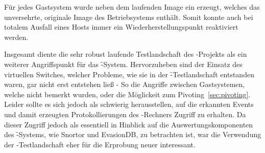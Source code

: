 Für jedes Gastsystem wurde neben dem laufenden Image ein
 erzeugt, welches das unversehrte, originale Image des
Betriebsystems enthält. Somit konnte auch bei totalem Ausfall eines
Hosts immer ein Wiederherstellungspunkt reaktiviert werden.

Insgesamt diente die sehr robust laufende Testlandschaft des
-Projekts als ein weiterer Angriffspunkt für das
\f-System. Hervorzuheben sind der Einsatz des virtuellen Switches,
welcher Probleme, wie sie in der \f-Testlandschaft entstanden
waren, gar nicht erst entstehen ließ - So die Angriffe zwischen
Gastsystemen, welche nicht bemerkt wurden, oder die Möglickeit zum
Pivoting~\ref{sec:pivoting}. Leider sollte es sich jedoch als
schwierig herausstellen, auf die erkannten Events und damit erzeugten
Protokollierungen des -Rechners Zugriff zu erhalten. Da
dieser Zugriff jedoch als essentiell in Hinblick auf die
Auswertungskomponenten des \f-Systems, wie Snortor und EvasionDB,
zu betrachten ist, war die Verwendung der -Testlandschaft eher
für die Erprobung neuer  interessant.


